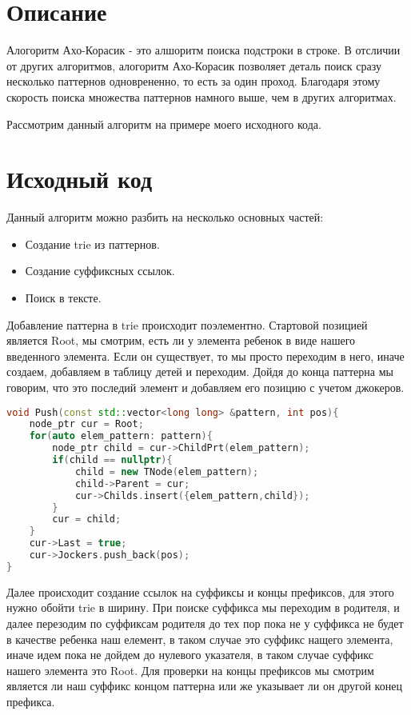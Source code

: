 \section{Описание}
Алогоритм Ахо-Корасик - это алшоритм поиска подстроки в строке. В отсличии от других алгоритмов, алогоритм Ахо-Корасик позволяет деталь поиск сразу несколько паттернов одноврененно, то есть за один проход. Благодаря этому скорость поиска множества паттернов намного выше, чем в других алгоритмах.

Рассмотрим данный алгоритм на примере моего исходного кода.
\pagebreak

\section{Исходный код}
Данный алгоритм можно разбить на несколько основных частей:
\begin{itemize}
	\item Создание trie из паттернов.
	\item Создание суффиксных ссылок.
	\item Поиск в тексте.
\end{itemize}

Добавление паттерна в trie происходит поэлементно. Стартовой позицией является Root, мы смотрим, есть ли у элемента ребенок в виде нашего введенного элемента. Если он существует, то мы просто переходим в него, иначе создаем, добавляем в таблицу детей и переходим. Дойдя до конца паттерна мы говорим, что это последий элемент и добавляем его позицию с учетом джокеров.

\begin{lstlisting}[language=C++]
void Push(const std::vector<long long> &pattern, int pos){
	node_ptr cur = Root;
	for(auto elem_pattern: pattern){
		node_ptr child = cur->ChildPrt(elem_pattern);
		if(child == nullptr){
			child = new TNode(elem_pattern);
			child->Parent = cur;
			cur->Childs.insert({elem_pattern,child});
		}
		cur = child;
	}
	cur->Last = true;
	cur->Jockers.push_back(pos);
}
\end{lstlisting}

Далее происходит создание ссылок на суффиксы и концы префиксов, для этого нужно обойти trie в ширину. При поиске суффикса мы переходим в родителя, и далее перезодим по суффиксам родителя до тех пор пока не у суффикса не будет в качестве ребенка наш елемент, в таком случае это суффикс нащего элемента, иначе идем пока не дойдем до нулевого указателя, в таком случае суффикс нашего элемента это Root. Для проверки на концы префиксов мы смотрим является ли наш суффикс концом паттерна или же указывает ли он другой конец префикса.


